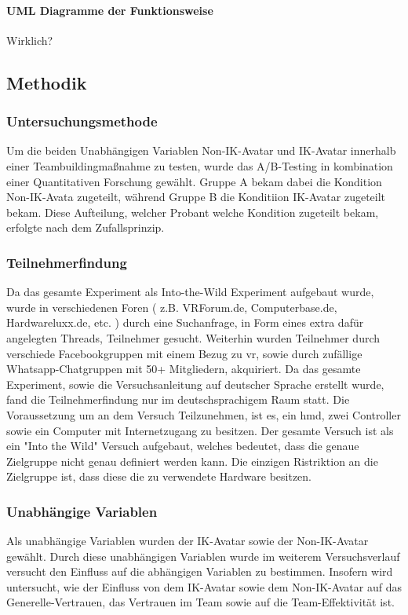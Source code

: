 \documentclass[a4paper,11pt]{article}%
\renewcommand{\\}{\vspace*{0.5\baselineskip} \newline}
\begin{document}
\paragraph{UML Diagramme der Funktionsweise}
	
Wirklich?
	
\subsection{Methodik}
\subsubsection{Untersuchungsmethode}
Um die beiden Unabhängigen Variablen \dq{}Non-IK-Avatar\dq{} und \dq{}IK-Avatar\dq{} innerhalb einer Teambuildingmaßnahme zu testen, wurde das A/B-Testing in kombination einer Quantitativen Forschung gewählt.
Gruppe A bekam dabei die Kondition \dq{}Non-IK-Avata\dq{} zugeteilt, während Gruppe B die Konditiion \dq{}IK-Avatar\dq{} zugeteilt bekam. Diese Aufteilung, welcher Probant welche Kondition zugeteilt bekam, erfolgte nach dem Zufallsprinzip. 

	\subsubsection{Teilnehmerfindung}
Da das gesamte Experiment als Into-the-Wild Experiment aufgebaut wurde, wurde in verschiedenen Foren ( z.B. VRForum.de, Computerbase.de, Hardwareluxx.de, etc. ) durch eine Suchanfrage, in Form eines extra dafür angelegten Threads, Teilnehmer gesucht. Weiterhin wurden Teilnehmer durch verschiede Facebookgruppen mit einem Bezug zu \ac{vr}, sowie durch zufällige Whatsapp-Chatgruppen mit 50+ Mitgliedern, akquiriert. Da das gesamte Experiment, sowie die Versuchsanleitung auf deutscher Sprache erstellt wurde, fand die Teilnehmerfindung nur im deutschsprachigem Raum statt.
Die Voraussetzung um an dem Versuch Teilzunehmen, ist es, ein \ac{hmd}, zwei Controller sowie ein Computer mit Internetzugang zu besitzen. Der gesamte Versuch ist als ein "Into the Wild" Versuch aufgebaut, welches bedeutet, dass die genaue Zielgruppe nicht genau definiert werden kann. Die einzigen Ristriktion an die Zielgruppe ist, dass diese die zu verwendete Hardware besitzen.\\
		
	\subsubsection{Unabhängige Variablen}
Als unabhängige Variablen wurden der \dq{}IK-Avatar\dq{} sowie der \dq{}Non-IK-Avatar\dq{} gewählt. Durch diese  unabhängigen Variablen wurde im weiterem Versuchsverlauf versucht den Einfluss auf die abhängigen Variablen zu bestimmen.
Insofern wird untersucht, wie der Einfluss von dem \dq{}IK-Avatar\dq{} sowie dem \dq{}Non-IK-Avatar\dq{} auf das Generelle-Vertrauen, das Vertrauen im Team sowie auf die Team-Effektivität ist.
\end{document}

